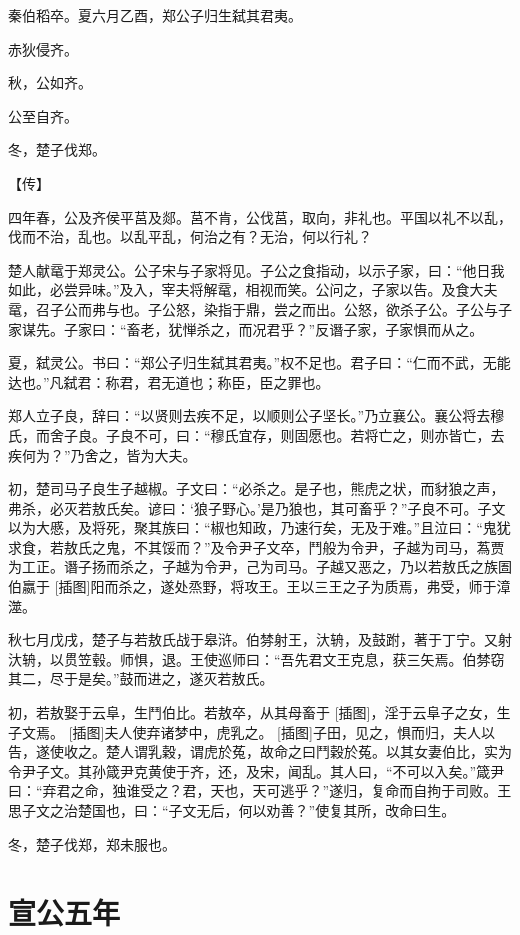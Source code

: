 \documentclass[a4paper,12pt,UTF8,twoside]{ctexbook}
\begin{document}
秦伯稻卒。夏六月乙酉，郑公子归生弑其君夷。

赤狄侵齐。

秋，公如齐。

公至自齐。

冬，楚子伐郑。

【传】

四年春，公及齐侯平莒及郯。莒不肯，公伐莒，取向，非礼也。平国以礼不以乱，伐而不治，乱也。以乱平乱，何治之有？无治，何以行礼？

楚人献鼋于郑灵公。公子宋与子家将见。子公之食指动，以示子家，曰：“他日我如此，必尝异味。”及入，宰夫将解鼋，相视而笑。公问之，子家以告。及食大夫鼋，召子公而弗与也。子公怒，染指于鼎，尝之而出。公怒，欲杀子公。子公与子家谋先。子家曰：“畜老，犹惮杀之，而况君乎？”反谮子家，子家惧而从之。

夏，弑灵公。书曰：“郑公子归生弑其君夷。”权不足也。君子曰：“仁而不武，无能达也。”凡弑君：称君，君无道也；称臣，臣之罪也。

郑人立子良，辞曰：“以贤则去疾不足，以顺则公子坚长。”乃立襄公。襄公将去穆氏，而舍子良。子良不可，曰：“穆氏宜存，则固愿也。若将亡之，则亦皆亡，去疾何为？”乃舍之，皆为大夫。

初，楚司马子良生子越椒。子文曰：“必杀之。是子也，熊虎之状，而豺狼之声，弗杀，必灭若敖氏矣。谚曰：‘狼子野心。’是乃狼也，其可畜乎？”子良不可。子文以为大慼，及将死，聚其族曰：“椒也知政，乃速行矣，无及于难。”且泣曰：“鬼犹求食，若敖氏之鬼，不其馁而？”及令尹子文卒，鬥般为令尹，子越为司马，蒍贾为工正。谮子扬而杀之，子越为令尹，己为司马。子越又恶之，乃以若敖氏之族圄伯嬴于 [插图]阳而杀之，遂处烝野，将攻王。王以三王之子为质焉，弗受，师于漳澨。

秋七月戊戌，楚子与若敖氏战于皋浒。伯棼射王，汏辀，及鼓跗，著于丁宁。又射汏辀，以贯笠毂。师惧，退。王使巡师曰：“吾先君文王克息，获三矢焉。伯棼窃其二，尽于是矣。”鼓而进之，遂灭若敖氏。

初，若敖娶于云阜，生鬥伯比。若敖卒，从其母畜于 [插图]，淫于云阜子之女，生子文焉。 [插图]夫人使弃诸梦中，虎乳之。 [插图]子田，见之，惧而归，夫人以告，遂使收之。楚人谓乳穀，谓虎於菟，故命之曰鬥穀於菟。以其女妻伯比，实为令尹子文。其孙箴尹克黄使于齐，还，及宋，闻乱。其人曰，“不可以入矣。”箴尹曰：“弃君之命，独谁受之？君，天也，天可逃乎？”遂归，复命而自拘于司败。王思子文之治楚国也，曰：“子文无后，何以劝善？”使复其所，改命曰生。

冬，楚子伐郑，郑未服也。

\chapter{宣公五年}
\end{document}
